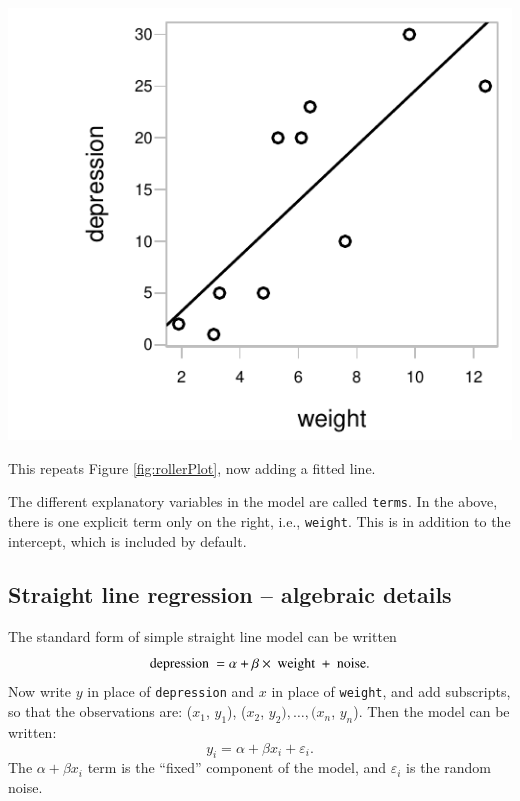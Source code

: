 \begin{marginfigure}
\begin{Schunk}


\centerline{\includegraphics[width=\textwidth]{figs/8-pltWline-1} }

\end{Schunk}
\caption{This repeats Figure \ref{fig:rollerPlot}, now adding a fitted
  line.}\label{fig:rollerPlot-withline}
\end{marginfigure}

The different explanatory variables in the model are called
\texttt{terms}.  In the above, there is one explicit term only on the
right, i.e., \texttt{weight}. This is in addition to the intercept,
which is included by default.

\subsection{Straight line regression -- algebraic details}\label{ss:briefls}
The standard form of simple straight line model can be written\vspace*{-1pt}
\[ \mbox{depression } = \alpha + \beta \times \mbox{ weight } + \mbox{ noise}.
\vspace*{-4pt}
\]
Now write $y$ in place of \texttt{depression} and $x$ in place of
\texttt{weight}, and add subscripts, so that the observations are:
($x_{1}$, $y_{1}$), ($x_{2}$, $y_{2}),\ldots{,} (x_{n}$, $y_{n}$).  Then
the model can be written:
 \[ y_{i} = \alpha + \beta x_{i} + \varepsilon_{i}.\]
The $\alpha +
\beta x_{i}$ term is the ``fixed'' component of the model, and
$\varepsilon_{i}$ is the random noise.

